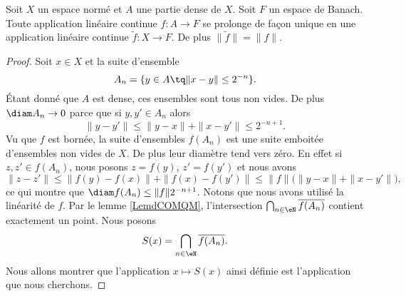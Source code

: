 \begin{proposition} \label{PropTTiRgAq}
    Soit \( X\) un espace normé et \( A\) une partie dense de \( X\). Soit \( F\) un espace de Banach. Toute application linéaire continue \( f\colon A\to F\) se prolonge de façon unique en une application linéaire continue \( \tilde f\colon X\to F\). De plus \( \| \tilde f \|=\| f \|\).
\end{proposition}

\begin{proof}
    Soit \( x\in X\) et la suite d'ensemble
    \begin{equation}
        A_n=\{ y\in A\tq \| x-y \|\leq 2^{-n}\}.
    \end{equation}
    Étant donné que \( A\) est dense, ces ensembles sont tous non vides. De plus \( \diam A_n\to 0\) parce que si \( y,y'\in A_n\) alors
    \begin{equation}
        \| y-y' \|\leq\| y-x \|+\| x-y' \|\leq 2^{-n+1}.
    \end{equation}
    Vu que \( f\) est bornée, la suite d'ensembles \( f(A_n)\) est une suite emboitée d'ensembles non vides de \( X\). De plus leur diamètre tend vers zéro. En effet si \( z,z'\in f(A_n)\), nous posons \( z=f(y)\), \( z'=f(y')\) et nous avons
    \begin{equation}
        \| z-z' \|\leq \| f(y)-f(x) \|+\| f(x)-f(y') \|\leq \| f \|\big( \| y-x \|+\| x-y' \| \big),
    \end{equation}
    ce qui montre que \( \diam f(A_n)\leq \| f \|2^{-n+1}\).  Notons que nous avons utilisé la linéarité de \( f\). Par le lemme \ref{LemdCOMQM}, l'intersection \( \bigcap_{n\in \eN}\overline{ f(A_n) }\) contient exactement un point. Nous posons
    \begin{equation}
        S(x)=\bigcap_{n\in \eN}\overline{ f(A_n) }.
    \end{equation}
    Nous allons montrer que l'application \( x\mapsto S(x)\) ainsi définie est l'application que nous cherchons. 


\end{proof}

